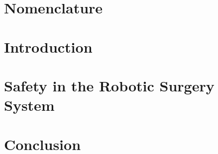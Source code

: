 
\graphicspath{{figures/}}


	






\setcounter{page}{1}
\renewcommand{\thepage}{\Roman{page}}




\setlength\parskip{0ex}
\tableofcontents
\setlength\parskip{1ex}

\chapter*{Nomenclature}\label{chap:acronym}
\printglossary[style=mcoltree,title=Glossary] %
\printglossary[type=\acronymtype,style=glossary2col] %
\printglossary[type=symbols,style=altlong4col] %
\clearpage








\cleardoublepage
\setcounter{page}{1}
\renewcommand{\thepage}{\arabic{page}}

\chapter{Introduction}\label{chap:intro}



\chapter{Safety in the Robotic Surgery System}



\chapter{Conclusion}\label{chap:conclusion}



\begingroup
\raggedright
\clearpage
{}

\endgroup
\label{sourceliste}

\newpage

\begin{appendices}
\appendix
\renewcommand{\appendixname}{Appendix}
\renewcommand{\appendixtocname}{Appendix}



\end{appendices}
